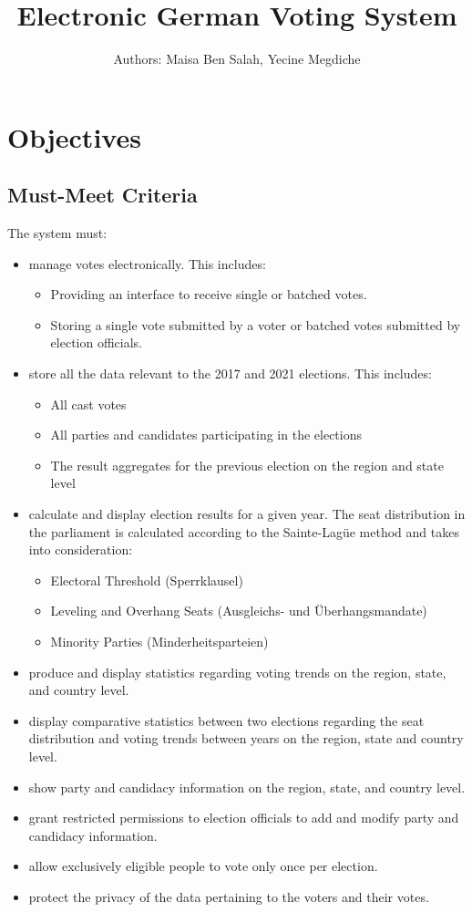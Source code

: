 \documentclass[a4paper]{article}
\title{Electronic German Voting System}
\author{Authors: Maisa Ben Salah, Yecine Megdiche}
\begin{document}
\maketitle
\section{Objectives}
\subsection{Must-Meet Criteria}
The system must:
\begin{itemize}
\item manage votes electronically. This includes:
        \begin{itemize}
      \item Providing an interface to receive single or batched votes.
      \item Storing a single vote submitted by a voter or batched votes submitted by election officials.
      \end{itemize}
  \item store all the data relevant to the 2017 and 2021 elections. This includes:
    \begin{itemize}
      \item All cast votes
      \item All parties and candidates participating in the elections
      \item The result aggregates for the previous election on the region and state level
    \end{itemize}
  \item calculate and display election results for a given year. The seat distribution in the parliament is calculated according to the Sainte-Lag\"ue method and takes into consideration:
        \begin{itemize}
          \item Electoral Threshold (Sperrklausel)
          \item Leveling and Overhang Seats (Ausgleichs- und \"Uberhangsmandate)
          \item Minority Parties (Minderheitsparteien)
        \end{itemize}
  \item produce and display statistics regarding voting trends on the region, state, and country level.
  \item display comparative statistics between two elections regarding the seat distribution and voting trends between years on the region, state and country level.
  \item show party and candidacy information on the region, state, and country level.
  \item grant restricted permissions to election officials to add and modify party and candidacy information.
  \item allow exclusively eligible people to vote only once per election.
  \item protect the privacy of the data pertaining to the voters and their votes.

\end{itemize}
\end{document}
